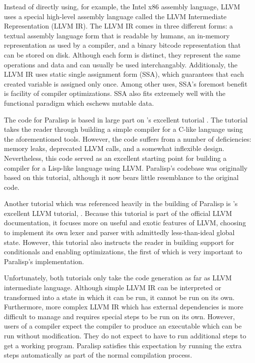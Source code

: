 \documentclass[
abstracton,
fontsize=12pt,
]{scrartcl}
\begin{document}
Instead of directly using, for example, the Intel x86 assembly language, LLVM uses a special high-level assembly language called the LLVM Intermediate Representation (LLVM IR). The LLVM IR comes in three different forms: a textual assembly language form that is readable by humans, an in-memory representation as used by a compiler, and a binary bitcode representation that can be stored on disk. Although each form is distinct, they represent the same operations and data and can usually be used interchangably. Additionaly, the LLVM IR uses static single assignment form (SSA), which guarantees that each created variable is assigned only once. Among other uses, SSA's foremost benefit is facility of compiler optimizations. SSA also fits extremely well with the functional paradigm which eschews mutable data.

The code for Paralisp is based in large part on \citeauthor{toy-compiler}'s excellent tutorial  \autocite{toy-compiler}. The tutorial takes the reader through building a simple compiler for a C-like language using the aforementioned tools. However, the code suffers from a number of deficiencies: memory leaks, deprecated LLVM calls, and a somewhat inflexible design. Nevertheless, this code served as an excellent starting point for building a compiler for a Lisp-like language using LLVM\@. Paralisp's codebase was originally based on this tutorial, although it now bears little resemblance to the original code.

Another tutorial which was referenced heavily in the building of Paralisp is \citeauthor{llvm-kaleidescope}'s excellent LLVM tutorial,  \autocite{llvm-kaleidescope}. Because this tutorial is part of the official LLVM documentation, it focuses more on useful and exotic features of LLVM, choosing to implement its own lexer and parser with admittedly less-than-ideal global state. However, this tutorial also instructs the reader in building support for conditionals and enabling optimizations, the first of which is very important to Paralisp's implementation.

Unfortunately, both tutorials only take the code generation as far as LLVM intermediate language. Although simple LLVM IR can be interpreted or transformed into a state in which it can be run, it cannot be run on its own. Furthermore, more complex LLVM IR which has external dependencies is more difficult to manage and requires special steps to be run on its own. However, users of a compiler expect the compiler to produce an executable which can be run without modification. They do not expect to have to run additional steps to get a working program. Paralisp satisfies this expectation by running the extra steps automatically as part of the normal compilation process.
\end{document}
